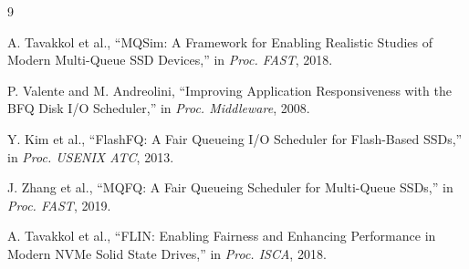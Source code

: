 \documentclass[11pt]{article}
\begin{document}
\begin{thebibliography}{9}

A. Tavakkol et al., ``MQSim: A Framework for Enabling Realistic Studies of Modern Multi-Queue SSD Devices,'' in \textit{Proc. FAST}, 2018.

P. Valente and M. Andreolini, ``Improving Application Responsiveness with the BFQ Disk I/O Scheduler,'' in \textit{Proc. Middleware}, 2008.

Y. Kim et al., ``FlashFQ: A Fair Queueing I/O Scheduler for Flash-Based SSDs,'' in \textit{Proc. USENIX ATC}, 2013.

J. Zhang et al., ``MQFQ: A Fair Queueing Scheduler for Multi-Queue SSDs,'' in \textit{Proc. FAST}, 2019.

A. Tavakkol et al., ``FLIN: Enabling Fairness and Enhancing Performance in Modern NVMe Solid State Drives,'' in \textit{Proc. ISCA}, 2018.

\end{thebibliography}
\end{document}
